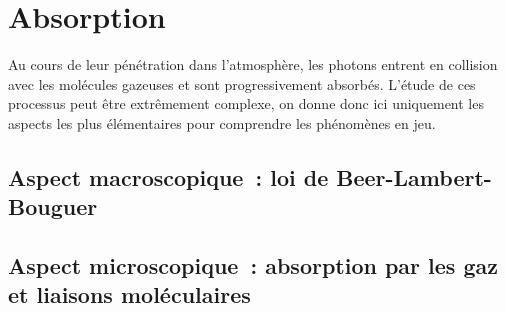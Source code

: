 \documentclass[a4paper,DIV16,10pt]{scrartcl}
\begin{document}
\mk \section{Absorption} Au cours de leur pénétration dans l'atmosphère, les photons entrent en collision avec les molécules gazeuses et sont progressivement absorbés. L'étude de ces processus peut être extrêmement complexe, on donne donc ici uniquement les aspects les plus élémentaires pour comprendre les phénomènes en jeu.
	\sk \subsection{Aspect macroscopique~: loi de Beer-Lambert-Bouguer}
		
	\sk \subsection{Aspect microscopique~: absorption par les gaz et liaisons moléculaires}
		
		
\end{document}
